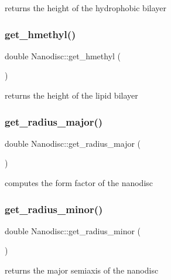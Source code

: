returns the height of the hydrophobic bilayer \mbox{\label{class_nanodisc_a2f2d5f1546800821bcd957e0c96bfea2}} 
\subsubsection{\texorpdfstring{get\_hmethyl()}{get\_hmethyl()}}
{\footnotesize\ttfamily double Nanodisc\+::get\+\_\+hmethyl (\begin{DoxyParamCaption}{ }\end{DoxyParamCaption})}

returns the height of the lipid bilayer \mbox{\label{class_nanodisc_a63dd4a835a10d9e1e2f0e8a44f4976cb}} 
\subsubsection{\texorpdfstring{get\_radius\_major()}{get\_radius\_major()}}
{\footnotesize\ttfamily double Nanodisc\+::get\+\_\+radius\+\_\+major (\begin{DoxyParamCaption}{ }\end{DoxyParamCaption})}

computes the form factor of the nanodisc \mbox{\label{class_nanodisc_ab7687bac66c2de3f72c11d1b1f1f9f49}} 
\subsubsection{\texorpdfstring{get\_radius\_minor()}{get\_radius\_minor()}}
{\footnotesize\ttfamily double Nanodisc\+::get\+\_\+radius\+\_\+minor (\begin{DoxyParamCaption}{ }\end{DoxyParamCaption})}

returns the major semiaxis of the nanodisc \mbox{\label{class_nanodisc_a727085dba7e6269e0d17de14187d4ae2}} 
